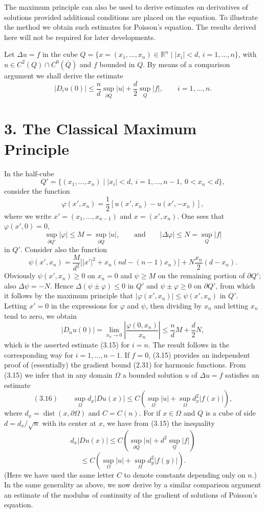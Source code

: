 The maximum principle can also be used to derive estimates on derivatives of solutions provided additional conditions are placed on the equation. To illustrate the method we obtain such estimates for Poisson's equation. The results derived here will not be required for later developments.

\medskip

\noindent Let $\Delta u=f$ in the cube $Q=\{x=(x_1,\dots,x_n)\in \mathbb{R}^n \mid |x_i|<d,\, i=1,\dots,n\}$, with $u\in C^2(Q)\cap C^0(\overline{Q})$ and $f$ bounded in $Q$. By means of a comparison argument we shall derive the estimate
\begin{equation}
\tag{3.15}
|D_i u(0)| \le \frac{n}{d}\sup_{\partial Q}|u| + \frac{d}{2}\sup_Q|f|,\qquad i=1,\dots,n.
\end{equation}


\section*{3. The Classical Maximum Principle}

In the half-cube
\[
Q'=\{(x_1,\dots,x_n)\mid |x_i|<d,\ i=1,\dots,n-1,\ 0<x_n<d\},
\]
consider the function
\[
\varphi(x',x_n)=\frac{1}{2}[u(x',x_n)-u(x',-x_n)],
\]
where we write $x'=(x_1,\dots,x_{n-1})$ and $x=(x',x_n)$. One sees that $\varphi(x',0)=0$,
\[
\sup_{\partial Q'}|\varphi|\le M=\sup_{\partial Q}|u|,\qquad \text{and}\qquad |\Delta\varphi|\le N=\sup_Q|f|
\]
in $Q'$. Consider also the function
\[
\psi(x',x_n)=\frac{M}{d^2}\bigl[|x'|^2+x_n(nd-(n-1)x_n)\bigr]+N\frac{x_n}{2}(d-x_n).
\]
Obviously $\psi(x',x_n)\ge 0$ on $x_n=0$ and $\psi\ge M$ on the remaining portion of $\partial Q'$; also $\Delta\psi=-N$. Hence $\Delta(\psi\pm\varphi)\le 0$ in $Q'$ and $\psi\pm\varphi\ge 0$ on $\partial Q'$, from which it follows by the maximum principle that $|\varphi(x',x_n)|\le\psi(x',x_n)$ in $Q'$. Letting $x'=0$ in the expressions for $\varphi$ and $\psi$, then dividing by $x_n$ and letting $x_n$ tend to zero, we obtain
\[
|D_nu(0)|=\lim_{x_n\to 0}\left|\frac{\varphi(0,x_n)}{x_n}\right|\le \frac{n}{d}M+\frac{d}{2}N,
\]
which is the asserted estimate (3.15) for $i=n$. The result follows in the corresponding way for $i=1,\dots,n-1$. If $f=0$, (3.15) provides an independent proof of (essentially) the gradient bound (2.31) for harmonic functions. From (3.15) we infer that in any domain $\Omega$ a bounded solution $u$ of $\Delta u=f$ satisfies an estimate
\[
(3.16)\qquad \sup_{\Omega} d_x|Du(x)|\le C\left(\sup_{\Omega}|u|+\sup_{\Omega} d_x^2|f(x)|\right),
\]
where $d_x=\operatorname{dist}(x,\partial\Omega)$ and $C=C(n)$. For if $x\in\Omega$ and $Q$ is a cube of side $d=d_x/\sqrt{n}$ with its center at $x$, we have from (3.15) the inequality
\[
d_x|Du(x)|\le C\left(\sup_{\partial Q}|u|+d^2\sup_Q|f|\right)
\]
\[
\le C\left(\sup_{\Omega}|u|+\sup_{\Omega} d_y^2|f(y)|\right).
\]
(Here we have used the same letter $C$ to denote constants depending only on $n$.) In the same generality as above, we now derive by a similar comparison argument an estimate of the modulus of continuity of the gradient of solutions of Poisson's equation.

